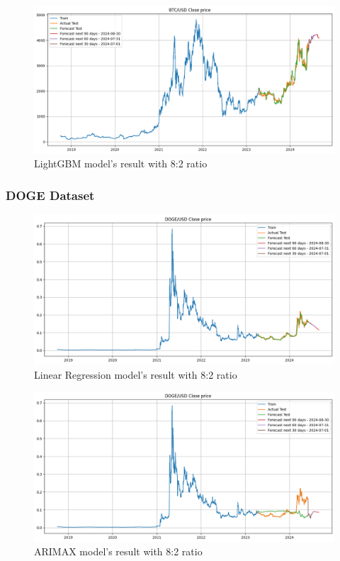 \documentclass{ieeeojies}
\begin{document}
\begin{figure}[H]
    \centering
    \includegraphics[width=0.8\linewidth]{./././visualize/LightGBM/ETH-80-20.png}
    \caption{LightGBM model’s result with 8:2 ratio}
    \label{fig:28}
\end{figure}
\subsubsection{DOGE Dataset}
\begin{figure}[H]
    \centering
    \includegraphics[width=0.8\linewidth]{./././visualize/LinearRegression/DOGE-80-20.png}
    \caption{Linear Regression model’s result with 8:2 ratio}
    \label{fig:29}
\end{figure}
\begin{figure}[H]
    \centering
    \includegraphics[width=0.8\linewidth]{./././visualize/ARIMAX/DOGE-80-20.png}
    \caption{ARIMAX model’s result with 8:2 ratio}
    \label{fig:30}
\end{figure}
\end{document}

